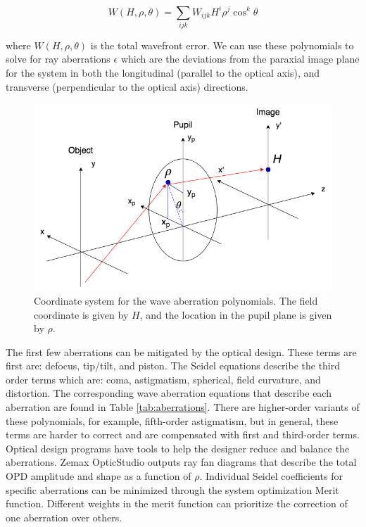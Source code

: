 \begin{equation}
    W(H,\rho, \theta)=\sum_{ijk} W_{ijk} H^i \rho^j \cos^k\theta
\end{equation}

\noindent where $W(H,\rho, \theta)$ is the total wavefront error. We can use these polynomials to solve for ray aberrations $\epsilon$ which are the deviations from the paraxial image plane for the system in both the longitudinal (parallel to the optical axis), and transverse (perpendicular to the optical axis) directions. 

\begin{figure}
    \centering
    \includegraphics[width=.8\textwidth]{Chapter Materials/Chapter Three Materials/Seidelcoord.png}
    \caption{Coordinate system for the wave aberration polynomials. The field coordinate is given by $H$, and the location in the pupil plane is given by $\rho$.}
    \label{fig:Seidel}
    \end{figure}
    
The first few aberrations can be mitigated by the optical design. These terms are first are: defocus, tip/tilt, and piston. The Seidel equations describe the third order terms which are: coma, astigmatism, spherical, field curvature, and distortion. The corresponding wave aberration equations that describe each aberration are found in Table \ref{tab:aberrations}. There are higher-order variants of these polynomials, for example, fifth-order astigmatism, but in general, these terms are harder to correct and are compensated with first and third-order terms. Optical design programs have tools to help the designer reduce and balance the aberrations. Zemax OpticStudio outputs ray fan diagrams that describe the total OPD amplitude and shape as a function of $\rho$. Individual Seidel coefficients for specific aberrations can be minimized through the system optimization Merit function. Different weights in the merit function can prioritize the correction of one aberration over others. 


